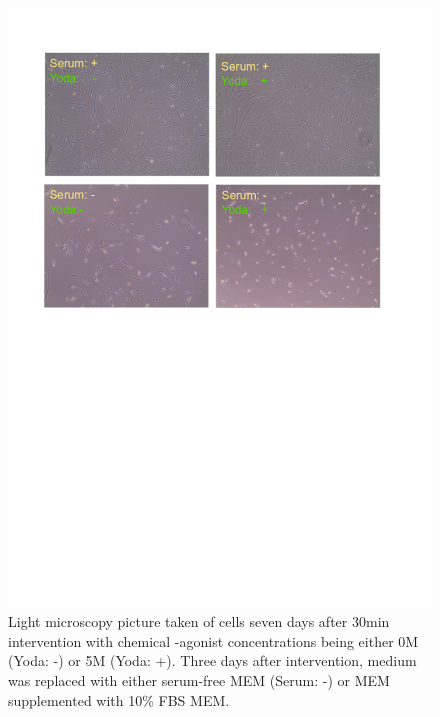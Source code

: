 \begin{figure}[ht]
\centering
\includegraphics[width = \linewidth{}]{LongTerm_CellPicture.png}
\caption{
Light microscopy picture taken of cells seven days after 30min intervention with chemical \Piezo{}-agonist concentrations being either 0\textmu{}M (Yoda: -) or 5\textmu{}M (Yoda: +). Three days after intervention, medium was replaced with either serum-free MEM\textalpha{} (Serum: -) or MEM\textalpha{} supplemented with 10\% FBS MEM\textalpha{}.}
\label{pic:Cells_LongTerm}
\end{figure}


